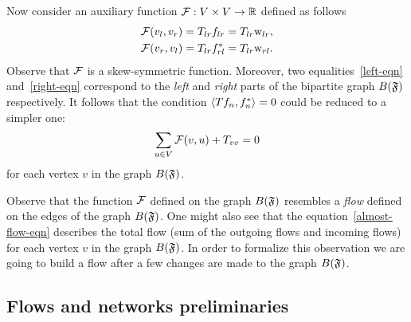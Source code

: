 \documentclass[12pt,oneside,a4paper]{amsart}
\begin{document}
      Now consider an auxiliary function $\mathcal{{F}}: V \times V \to \mathbb{R}$ defined as follows
      \begin{align*}
        &\mathcal{{F}}(v_l, v_r) = T_{lr} f_{lr} = T_{lr} \mathrm{w}_{lr},\\
        &\mathcal{{F}}(v_r, v_l) = T_{lr} f^*_{rl} = T_{lr} \mathrm{w}_{rl}.
      \end{align*}
      Observe that $\mathcal{{F}}$ is a skew-symmetric function.
      Moreover, two equalities~\eqref{left-eqn} and~\eqref{right-eqn} correspond to the \emph{left} and \emph{right}
        parts of the bipartite graph $B(\mathfrak{F})$ respectively.
      It follows that the condition $\langle Tf_n, f_n^* \rangle = 0$ could be reduced to a simpler one:
      \begin{equation}
        \label{almost-flow-eqn}
        \sum_{u \in V} \mathcal{{F}}(v, u) + T_{vv} = 0
      \end{equation}
        for each vertex $v$ in the graph $B(\mathfrak{F})$.
      \begin{remark}
        Observe that the function $\mathcal{{F}}$ defined on the graph $B(\mathfrak{F})$ resembles
          a \emph{flow} defined on the edges of the graph $B(\mathfrak{F})$.
        One might also see that the equation~\eqref{almost-flow-eqn} describes the total flow (sum of the outgoing flows and incoming flows) 
          for each vertex $v$ in the graph $B(\mathfrak{F})$.
        In order to formalize this observation we are going to build a flow
          after a few changes are made to the graph $B(\mathfrak{F})$.
      \end{remark}

    \medskip
    \subsection{Flows and networks preliminaries}
\end{document}
